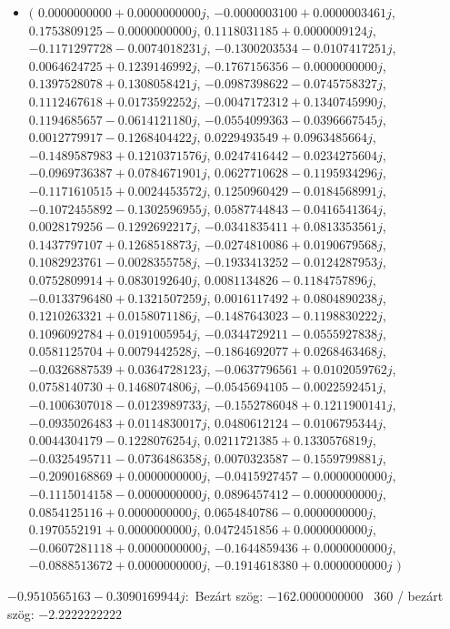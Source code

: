 \documentclass[14pt,a4paper]{article}
\begin{document}
\begin{itemize}
\item
$\big($
$0.0000000000+0.0000000000j$, $-0.0000003100+0.0000003461j$, $0.1753809125-0.0000000000j$, $0.1118031185+0.0000009124j$, $-0.1171297728-0.0074018231j$, $-0.1300203534-0.0107417251j$, $0.0064624725+0.1239146992j$, $-0.1767156356-0.0000000000j$, $0.1397528078+0.1308058421j$, $-0.0987398622-0.0745758327j$, $0.1112467618+0.0173592252j$, $-0.0047172312+0.1340745990j$, $0.1194685657-0.0614121180j$, $-0.0554099363-0.0396667545j$, $0.0012779917-0.1268404422j$, $0.0229493549+0.0963485664j$, $-0.1489587983+0.1210371576j$, $0.0247416442-0.0234275604j$, $-0.0969736387+0.0784671901j$, $0.0627710628-0.1195934296j$, $-0.1171610515+0.0024453572j$, $0.1250960429-0.0184568991j$, $-0.1072455892-0.1302596955j$, $0.0587744843-0.0416541364j$, $0.0028179256-0.1292692217j$, $-0.0341835411+0.0813353561j$, $0.1437797107+0.1268518873j$, $-0.0274810086+0.0190679568j$, $0.1082923761-0.0028355758j$, $-0.1933413252-0.0124287953j$, $0.0752809914+0.0830192640j$, $0.0081134826-0.1184757896j$, $-0.0133796480+0.1321507259j$, $0.0016117492+0.0804890238j$, $0.1210263321+0.0158071186j$, $-0.1487643023-0.1198830222j$, $0.1096092784+0.0191005954j$, $-0.0344729211-0.0555927838j$, $0.0581125704+0.0079442528j$, $-0.1864692077+0.0268463468j$, $-0.0326887539+0.0364728123j$, $-0.0637796561+0.0102059762j$, $0.0758140730+0.1468074806j$, $-0.0545694105-0.0022592451j$, $-0.1006307018-0.0123989733j$, $-0.1552786048+0.1211900141j$, $-0.0935026483+0.0114830017j$, $0.0480612124-0.0106795344j$, $0.0044304179-0.1228076254j$, $0.0211721385+0.1330576819j$, $-0.0325495711-0.0736486358j$, $0.0070323587-0.1559799881j$, $-0.2090168869+0.0000000000j$, $-0.0415927457-0.0000000000j$, $-0.1115014158-0.0000000000j$, $0.0896457412-0.0000000000j$, $0.0854125116+0.0000000000j$, $0.0654840786-0.0000000000j$, $0.1970552191+0.0000000000j$, $0.0472451856+0.0000000000j$, $-0.0607281118+0.0000000000j$, $-0.1644859436+0.0000000000j$, $-0.0888513672+0.0000000000j$, $-0.1914618380+0.0000000000j$
$\big)$
\end{itemize}
$-0.9510565163-0.3090169944j$:\
Bezárt szög: $-162.0000000000$ \
360 / bezárt szög: $-2.2222222222$\
\end{document}
